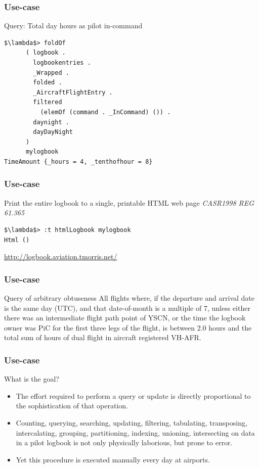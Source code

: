 \begin{frame}[fragile]
\frametitle{Use-case}
\begin{block}{Query: Total day hours as pilot in-command}
\begin{lstlisting}[style=haskell,basicstyle=\scriptsize\ttfamily,mathescape]
$\lambda$> foldOf
      ( logbook .
        logbookentries .
        _Wrapped .
        folded .
        _AircraftFlightEntry .
        filtered
          (elemOf (command . _InCommand) ()) .
        daynight .
        dayDayNight
      )
      mylogbook
TimeAmount {_hours = 4, _tenthofhour = 8}
\end{lstlisting}
\end{block}
\end{frame}

\begin{frame}[fragile]
\frametitle{Use-case}
\begin{block}{Print the entire logbook to a single, printable HTML web page \emph{CASR1998 REG 61.365}}
\begin{lstlisting}[style=haskell,mathescape]
$\lambda$> :t htmlLogbook mylogbook
Html ()
\end{lstlisting}
\end{block}
\href{http://logbook.aviation.tmorris.net/}{http://logbook.aviation.tmorris.net/}
\end{frame}

\begin{frame}[fragile]
\frametitle{Use-case}
\begin{block}{Query of arbitrary obtuseness}
All flights where, if the departure and arrival date is the same day (UTC), and that date-of-month is a multiple of 7, unless either there was an intermediate flight path point of YSCN, or the time the logbook owner was PiC for the first three legs of the flight, is between 2.0 hours and the total sum of hours of dual flight in aircraft registered VH-AFR.
\end{block}
\end{frame}

\begin{frame}[fragile]
\frametitle{Use-case}
\begin{block}{What is the goal?}
\begin{itemize}
\item<1-> The effort required to perform a query or update is directly proportional to the sophistication of that operation.
\item<2-> Counting, querying, searching, updating, filtering, tabulating, transposing, intercalating, grouping, partitioning, indexing, unioning, intersecting on data in a pilot logbook is not only physically laborious, but prone to error.
\item<3-> Yet this procedure is executed manually every day at airports.
\end{itemize}

\end{block}
\end{frame}

